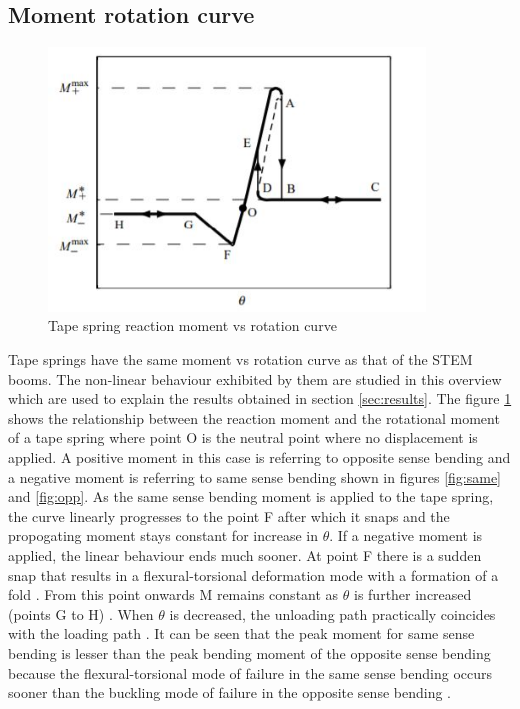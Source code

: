 \subsection{Moment rotation curve}
\begin{figure}[!hbt]
    \centering
     \includegraphics[width=10cm]{images/tapespring.JPG}
     \caption{Tape spring reaction moment vs rotation curve \cite{Seffen1999}}
  \label{fig:tapetheory}
\end{figure}
Tape springs have the same moment vs rotation curve as that of the STEM booms. The non-linear behaviour exhibited by them are studied in this overview which are used to explain the results obtained in section \ref{sec:results}. 
The figure \ref{fig:tapetheory} shows the relationship between the reaction moment and the rotational moment of a tape spring where point O is the neutral point where no displacement is applied. A positive moment in this case is referring to opposite sense bending and a negative moment is referring to same sense bending shown in figures \ref{fig:same} and \ref{fig:opp}. 
As the same sense bending moment is applied to the tape spring, the curve linearly progresses to the point F after which it snaps and the propogating moment stays constant for increase in $\theta$. If a negative moment is applied, the linear behaviour ends much sooner. At point F there is a sudden snap that results in a flexural-torsional deformation mode with a formation of a fold \cite{Seffen1999}.
From this point onwards M remains constant as $\theta$ is further increased (points G to H) \cite{Seffen1999}. When $\theta$ is decreased, the unloading path practically coincides with the loading path \cite{Seffen1999}. It can be seen that the peak moment for same sense bending is lesser than the peak bending moment of the opposite sense bending because the flexural-torsional mode of failure in the same sense bending occurs sooner than the buckling mode of failure in the opposite sense bending \cite{Seffen1999}. 

